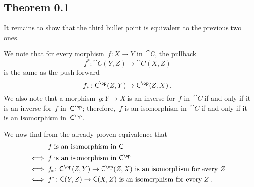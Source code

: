 \subsection{Theorem 0.1}

It remains to show that the third bullet point is equivalent to the previous two ones.

We note that for every morphism~$f \colon X \to Y$ in~$\cat{C}$, the pullback
\[
	f^* \colon \cat{C}(Y, Z) \to \cat{C}(X, Z)
\]
is the same as the push-forward
\[
	f_* \colon \cat{C}^{\op}(Z, Y) \to \cat{C}^{\op}(Z, X) \,.
\]
We also note that a morphism~$g \colon Y \to X$ is an inverse for~$f$ in~$\cat{C}$ if and only if it is an inverse for~$f$ in~$\cat{C}^{\op}$;
therefore,~$f$ is an isomorphism in~$\cat{C}$ if and only if it is an isomorphism in~$\cat{C}^{\op}$.

We now find from the already proven equivalence that
\begin{align*}
	{}&
	\text{$f$ is an isomorphism in~$\cat{C}$}
	\\
	\iff{}&
	\text{$f$ is an isomorphism in~$\cat{C}^{\op}$}
	\\
	\iff{}&
	\text{$f_* \colon \cat{C}^{\op}(Z, Y) \to \cat{C}^{\op}(Z, X)$ is an isomorphism for every~$Z$}
	\\
	\iff{}&
	\text{$f^* \colon \cat{C}(Y, Z) \to \cat{C}(X, Z)$ is an isomorphism for every~$Z$} \,.
\end{align*}
